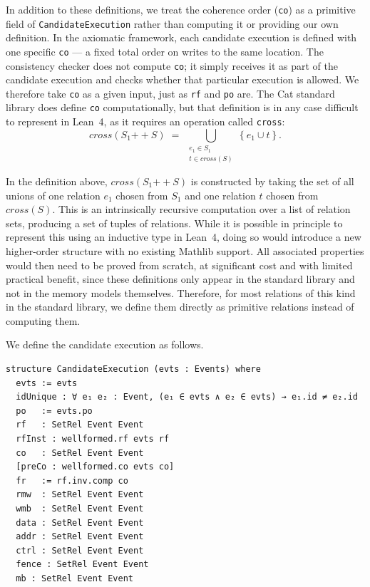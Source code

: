 In addition to these definitions, we treat the coherence order (\texttt{co}) as a primitive field of \texttt{CandidateExecution} rather than computing it or providing our own definition. In the axiomatic framework, each candidate execution is defined with one specific \texttt{co} — a fixed total order on writes to the same location. The consistency checker does not compute \texttt{co}; it simply receives it as part of the candidate execution and checks whether that particular execution is allowed. We therefore take \texttt{co} as a given input, just as \texttt{rf} and \texttt{po} are. The Cat standard library does define \texttt{co} computationally, but that definition is in any case difficult to represent in Lean~4, as it requires an operation called \texttt{cross}:
\[
  \mathit{cross}(S_1 \mathbin{+\!\!+} S)
  \;=\;
  \bigcup_{\substack{e_1 \in S_1 \\ t \in \mathit{cross}(S)}}
  \left\{
    e_1 \cup t
  \right\}.
\]

In the definition above, $\mathit{cross}(S_1 \mathbin{+\!\!+} S)$ is constructed by taking the set of all unions of one relation $e_1$ chosen from $S_1$ and one relation $t$ chosen from $\mathit{cross}(S)$. This is an intrinsically recursive computation over a list of relation sets, producing a set of tuples of relations. While it is possible in principle to represent this using an inductive type in Lean~4, doing so would introduce a new higher-order structure with no existing Mathlib support. All associated properties would then need to be proved from scratch, at significant cost and with limited practical benefit, since these definitions only appear in the standard library and not in the memory models themselves. Therefore, for most relations of this kind in the standard library, we define them directly as primitive relations instead of computing them.

We define the candidate execution as follows. 
\begin{lstlisting}
structure CandidateExecution (evts : Events) where
  evts := evts
  idUnique : ∀ e₁ e₂ : Event, (e₁ ∈ evts ∧ e₂ ∈ evts) → e₁.id ≠ e₂.id
  po   := evts.po
  rf   : SetRel Event Event
  rfInst : wellformed.rf evts rf
  co   : SetRel Event Event
  [preCo : wellformed.co evts co]
  fr   := rf.inv.comp co
  rmw  : SetRel Event Event
  wmb  : SetRel Event Event
  data : SetRel Event Event
  addr : SetRel Event Event
  ctrl : SetRel Event Event
  fence : SetRel Event Event
  mb : SetRel Event Event
\end{lstlisting}

